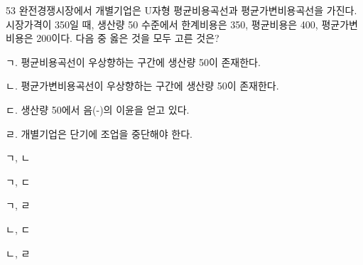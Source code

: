 \begin{question}{53}
완전경쟁시장에서 개별기업은 U자형 평균비용곡선과 평균가변비용곡선을 가진다. 시장가격이 350일 때, 생산량 50 수준에서 한계비용은 350, 평균비용은 400, 평균가변비용은 200이다. 다음 중 옳은 것을 모두 고른 것은?
\begin{framedtext}
ㄱ. 평균비용곡선이 우상향하는 구간에 생산량 50이 존재한다. \par
ㄴ. 평균가변비용곡선이 우상향하는 구간에 생산량 50이 존재한다. \par
ㄷ. 생산량 50에서 음(-)의 이윤을 얻고 있다. \par
ㄹ. 개별기업은 단기에 조업을 중단해야 한다.
\end{framedtext}
\begin{choices}
  \item ㄱ, ㄴ
  \item ㄱ, ㄷ
  \item ㄱ, ㄹ
  \item ㄴ, ㄷ
  \item ㄴ, ㄹ
\end{choices}
\end{question}
